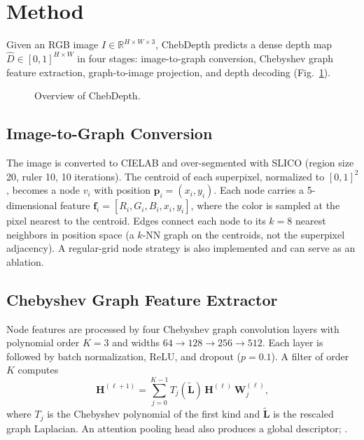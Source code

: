 \section{Method}
\label{sec:method}


Given an RGB image $I \in \mathbb{R}^{H\times W\times 3}$, ChebDepth predicts a dense depth map $\hat{D} \in [0,1]^{H\times W}$ in four stages: image-to-graph conversion, Chebyshev graph feature extraction, graph-to-image projection, and depth decoding (Fig.~\ref{fig:overview}).

\begin{figure}[t]
  \centering
  \caption{Overview of ChebDepth. }
  \label{fig:overview}
\end{figure}

\subsection{Image-to-Graph Conversion}
The image is converted to CIELAB and over-segmented with SLICO \cite{achanta2012slic} (region size 20, ruler 10, 10 iterations). The centroid of each superpixel, normalized to $[0,1]^2$, becomes a node $v_i$ with position $\mathbf{p}_i=(x_i,y_i)$.
Each node carries a 5-dimensional feature $\mathbf{f}_i=[R_i,G_i,B_i,x_i,y_i]$, where the color is sampled at the pixel nearest to the centroid.
Edges connect each node to its $k=8$ nearest neighbors in position space (a $k$-NN graph on the centroids, not the superpixel adjacency).
A regular-grid node strategy is also implemented and can serve as an ablation.

\subsection{Chebyshev Graph Feature Extractor}
Node features are processed by four Chebyshev graph convolution layers \cite{defferrard2016chebnet} with polynomial order $K=3$ and widths $64\!\rightarrow\!128\!\rightarrow\!256\!\rightarrow\!512$. Each layer is followed by batch normalization, ReLU, and dropout ($p=0.1$). A filter of order $K$ computes
\begin{equation}
  \mathbf{H}^{(\ell+1)} = \sum_{j=0}^{K-1} T_j(\tilde{\mathbf{L}})\,\mathbf{H}^{(\ell)}\,\mathbf{W}_j^{(\ell)},
\end{equation}
where $T_j$ is the Chebyshev polynomial of the first kind and $\tilde{\mathbf{L}}$ is the rescaled graph Laplacian.
An attention pooling head also produces a global descriptor; .

